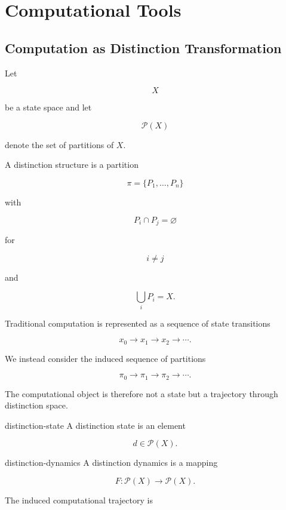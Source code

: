 \documentclass[12pt,twoside,openright]{book}
\begin{document}
\chapter{Computational Tools}
\label{app:comp}
\section{Computation as Distinction Transformation}

Let

\[
X
\]

be a state space and let

\[
\mathcal P(X)
\]

denote the set of partitions of \(X\).

A distinction structure is a partition

\[
\pi
=
\{P_1,\ldots,P_n\}
\]

with

\[
P_i\cap P_j=\varnothing
\]

for

\[
i\neq j
\]

and

\[
\bigcup_i P_i=X.
\]

Traditional computation is represented as a sequence of
state transitions

\[
x_0
\rightarrow
x_1
\rightarrow
x_2
\rightarrow
\cdots.
\]

We instead consider the induced sequence of partitions

\[
\pi_0
\rightarrow
\pi_1
\rightarrow
\pi_2
\rightarrow
\cdots.
\]

The computational object is therefore not a state but a
trajectory through distinction space.

\begin{definition}{distinction-state}
A distinction state is an element

\[
d
\in
\mathcal P(X).
\]
\end{definition}

\begin{definition}{distinction-dynamics}
A distinction dynamics is a mapping

\[
F :
\mathcal P(X)
\rightarrow
\mathcal P(X).
\]
\end{definition}

The induced computational trajectory is
\end{document}
